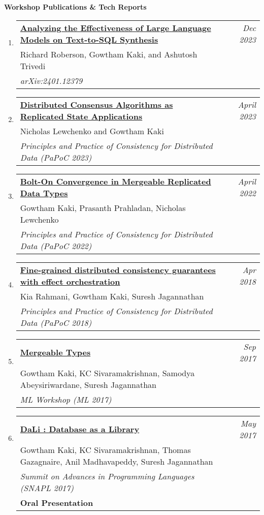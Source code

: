 \documentclass[10pt]{article}
\makeatletter
\newcommand{\lbar}[1]{{\color{#1}\ding{118}}\hspace*{2pt}}
\newenvironment{benumerate}[2]{
    \let\oldItem\item
    \def\item{\addtocounter{enumi}{-2}\oldItem}
    \begin{enumerate}[#2] \itemsep3pt
    \setcounter{enumi}{#1}
    \addtocounter{enumi}{1}}
  {\end{enumerate}}
\newenvironment{publication}[5]
{ \item
  \begin{tabular*}{7.5in}{p{6.3in}@{\extracolsep{\fill}}r}
    \href{#1}{\textbf{#2}} & \textit{#3}\\ #4 &\\ \textit{#5}&\\
  \end{tabular*}
} {}
\newenvironment{publicationNote}[6]
{ \item
  \begin{tabular*}{7.5in}{p{6.3in}@{\extracolsep{\fill}}r}
    \href{#1}{\textbf{#2}} & \textit{#3}\\ #4 &\\ \textit{#5}\\ \textbf{#6} \\
  \end{tabular*}
} {}
\newenvironment{region}[3]{%
  \vspace*{0.5ex}
  {{\textbf{\large{#1}}}}
  \begin{benumerate}{#3}{\color{RoyalBlue}#2}}
  {\end{benumerate}\vspace{0.8ex}}
\makeatother
\begin{document}
\begin{region} {\lbar{Mahogany}Workshop Publications \& Tech Reports}{{W}1}{5}

  \begin{publication} {https://arxiv.org/abs/2401.12379}
    {Analyzing the Effectiveness of Large Language Models on
    Text-to-SQL Synthesis}
    {Dec 2023} {Richard Roberson, Gowtham Kaki, and Ashutosh Trivedi}
    {arXiv:2401.12379}
  \end{publication}

  \begin{publication} {https://gowthamk.github.io/docs/papoc22.pdf}
		{Distributed Consensus Algorithms as Replicated State Applications }
		{April 2023} {Nicholas Lewchenko and Gowtham Kaki}
		{Principles and Practice of Consistency for Distributed Data
    (PaPoC 2023)}
  \end{publication}

  \begin{publication} {https://gowthamk.github.io/docs/papoc23.pdf}
		{Bolt-On Convergence in Mergeable Replicated Data Types}
		{April 2022} {Gowtham Kaki, Prasanth Prahladan, Nicholas Lewchenko}
		{Principles and Practice of Consistency for Distributed Data
    (PaPoC 2022)}
  \end{publication}

	\begin{publication}{https://gowthamk.github.io/docs/papoc18.pdf}
		{Fine-grained distributed consistency guarantees with effect orchestration}
		{Apr 2018}{Kia Rahmani, Gowtham Kaki, Suresh Jagannathan}
    {Principles and Practice of Consistency for Distributed Data (PaPoC 2018)}
  \end{publication}

  \begin{publication}{http://kcsrk.info/papers/mergeable_types_ml17.pdf}
    {Mergeable Types}
    {Sep 2017}{Gowtham Kaki, KC Sivaramakrishnan, Samodya Abeysiriwardane, Suresh Jagannathan}
    {ML Workshop (ML 2017)}
  \end{publication}

	\begin{publicationNote} {http://kcsrk.info/papers/dali_snapl17.pdf}
    {DaLi : Database as a Library}
    {May 2017} {Gowtham Kaki, KC Sivaramakrishnan, Thomas Gazagnaire, Anil Madhavapeddy, Suresh Jagannathan}
    {Summit on Advances in Programming Languages (SNAPL 2017)}
    {Oral Presentation}
  \end{publicationNote}


\end{region}
\end{document}
